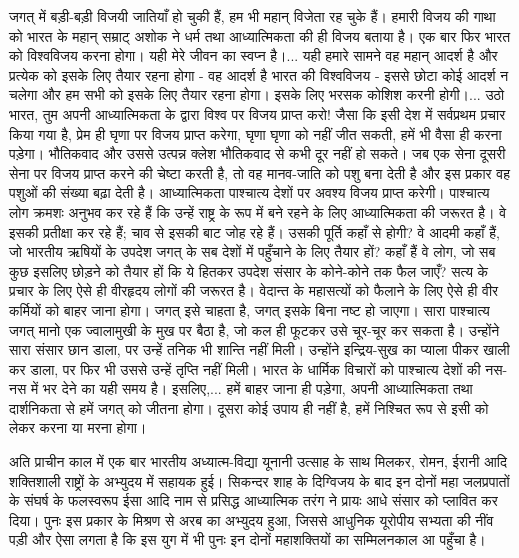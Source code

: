 जगत् में बड़ी-बड़ी विजयी जातियाँ हो चुकी हैं, हम भी महान् विजेता रह चुके हैं। हमारी विजय की गाथा को भारत के महान् सम्राट् अशोक ने धर्म तथा आध्यात्मिकता की ही विजय बताया है। एक बार फिर भारत को विश्वविजय करना होगा। यही मेरे जीवन का स्वप्न है।... यही हमारे सामने वह महान् आदर्श है और प्रत्येक को इसके लिए तैयार रहना होगा - वह आदर्श है भारत की विश्वविजय - इससे छोटा कोई आदर्श न चलेगा और हम सभी को इसके लिए तैयार रहना होगा। इसके लिए भरसक कोशिश करनी होगी।... उठो भारत, तुम अपनी आध्यात्मिकता के द्वारा विश्व पर विजय प्राप्त करो! जैसा कि इसी देश में सर्वप्रथम प्रचार किया गया है, प्रेम ही घृणा पर विजय प्राप्त करेगा, घृणा घृणा को नहीं जीत सकती, हमें भी वैसा ही करना पड़ेगा। भौतिकवाद और उससे उत्पन्न क्लेश भौतिकवाद से कभी दूर नहीं हो सकते। जब एक सेना दूसरी सेना पर विजय प्राप्त करने की चेष्टा करती है, तो वह मानव-जाति को पशु बना देती है और इस प्रकार वह पशुओं की संख्या बढ़ा देती है। आध्यात्मिकता पाश्चात्य देशों पर अवश्य विजय प्राप्त करेगी। पाश्चात्य लोग क्रमशः अनुभव कर रहे हैं कि उन्हें राष्ट्र के रूप में बने रहने के लिए आध्यात्मिकता की जरूरत है। वे इसकी प्रतीक्षा कर रहे हैं; चाव से इसकी बाट जोह रहे हैं। उसकी पूर्ति कहाँ से होगी? वे आदमी कहाँ हैं, जो भारतीय ऋषियों के उपदेश जगत् के सब देशों में पहुँचाने के लिए तैयार हों? कहाँ हैं वे लोग, जो सब कुछ इसलिए छोड़ने को तैयार हों कि ये हितकर उपदेश संसार के कोने-कोने तक फैल जाएँ? सत्य के प्रचार के लिए ऐसे ही वीरहृदय लोगों की जरूरत है। वेदान्त के महासत्यों को फैलाने के लिए ऐसे ही वीर कर्मियों को बाहर जाना होगा। जगत् इसे चाहता है, जगत् इसके बिना नष्ट हो जाएगा। सारा पाश्चात्य जगत् मानो एक ज्वालामुखी के मुख पर बैठा है, जो कल ही फूटकर उसे चूर-चूर कर सकता है। उन्होंने सारा संसार छान डाला, पर उन्हें तनिक भी शान्ति नहीं मिली। उन्होंने इन्द्रिय-सुख का प्याला पीकर खाली कर डाला, पर फिर भी उससे उन्हें तृप्ति नहीं मिली। भारत के धार्मिक विचारों को पाश्चात्य देशों की नस-नस में भर देने का यही समय है। इसलिए,... हमें बाहर जाना ही पड़ेगा, अपनी आध्यात्मिकता तथा दार्शनिकता से हमें जगत् को जीतना होगा। दूसरा कोई उपाय ही नहीं है, हमें निश्चित रूप से इसी को लेकर करना या मरना होगा। 

अति प्राचीन काल में एक बार भारतीय अध्यात्म-विद्या यूनानी उत्साह के साथ मिलकर, रोमन, ईरानी आदि शक्तिशाली राष्ट्रों के अभ्युदय में सहायक हुई। सिकन्दर शाह के दिग्विजय के बाद इन दोनों महा जलप्रपातों के संघर्ष के फलस्वरूप ईसा आदि नाम से प्रसिद्ध आध्यात्मिक तरंग ने प्रायः आधे संसार को प्लावित कर दिया। पुनः इस प्रकार के मिश्रण से अरब का अभ्युदय हुआ, जिससे आधुनिक यूरोपीय सभ्यता की नींव पड़ी और ऐसा लगता है कि इस युग में भी पुनः इन दोनों महाशक्तियों का सम्मिलनकाल आ पहुँचा है। 

\delimiter

\addtoendnotes{\protect\end{multicols}}


